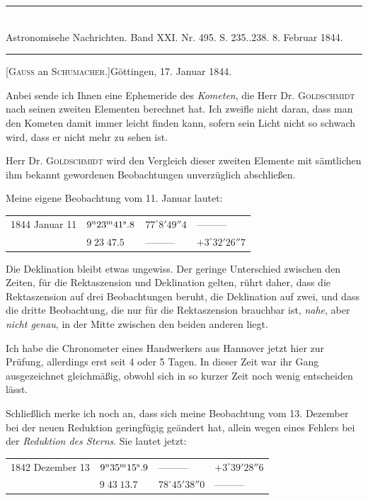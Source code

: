\clearpage
\hypertarget{native-469-letter}{}
\begin{center}
\rule{0.55\linewidth}{0.4pt}\\[2pt]
Astronomisehe Nachrichten. Band XXI. Nr. 495. S. 235..238. 8. Februar 1844.\\[2pt]
\rule{0.55\linewidth}{0.4pt}
\end{center}

\begin{center}[\textsc{Gauss} an \textsc{Schumacher.}]\quad Göttingen, 17. Januar 1844.\end{center}

Anbei sende ich Ihnen eine Ephemeride des \emph{Kometen}, die Herr Dr. \textsc{Goldschmidt} nach seinen zweiten Elementen berechnet hat. Ich zweifle nicht daran, dass man den Kometen damit immer leicht finden kann, sofern sein Licht nicht so schwach wird, dass er nicht mehr zu sehen ist.

Herr Dr. \textsc{Goldschmidt} wird den Vergleich dieser zweiten Elemente mit sämtlichen ihm bekannt gewordenen Beobachtungen unverzüglich abschließen.

Meine eigene Beobachtung vom 11. Januar lautet:
\begin{center}
\begin{tabular}{l|l|l|l}
1844 Januar 11 & $9^{\rm u}23^{\rm m}41^{\rm s}.8$ & $77^\circ8'49''4$ & ---\quad ---\quad --- \\
 & $9\;23\;47.5$ & ---\quad ---\quad --- & $+3^\circ32'26''7$ \\
\end{tabular}
\end{center}

Die Deklination bleibt etwas ungewiss. Der geringe Unterschied zwischen den Zeiten, für die Rektaszension und Deklination gelten, rührt daher, dass die Rektaszension auf drei Beobachtungen beruht, die Deklination auf zwei, und dass die dritte Beobachtung, die nur für die Rektaszension brauchbar ist, \emph{nahe}, aber \emph{nicht genau}, in der Mitte zwischen den beiden anderen liegt.

Ich habe die Chronometer eines Handwerkers aus Hannover jetzt hier zur Prüfung, allerdings erst seit 4 oder 5 Tagen. In dieser Zeit war ihr Gang ausgezeichnet gleichmäßig, obwohl sich in so kurzer Zeit noch wenig entscheiden lässt.

Schließlich merke ich noch an, dass sich meine Beobachtung vom 13. Dezember bei der neuen Reduktion geringfügig geändert hat, allein wegen eines Fehlers bei der \emph{Reduktion des Sterns}. Sie lautet jetzt:
\begin{center}
\begin{tabular}{l|l|l|l}
1842 Dezember 13 & $9^{\rm u}35^{\rm m}15^{\rm s}.9$ & ---\quad ---\quad --- & $+3^\circ39'28''6$ \\
 & $9\;43\;13.7$ & $78^\circ45'38''0$ & ---\quad ---\quad --- \\
\end{tabular}
\end{center}

